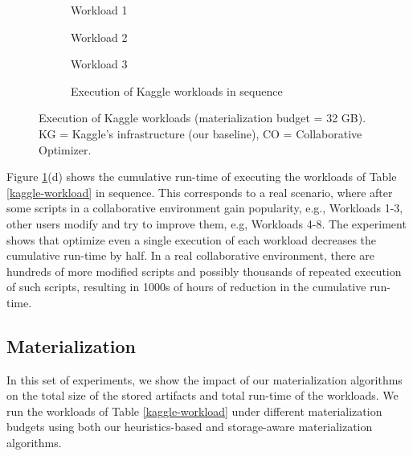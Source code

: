 \begin{figure}
\begin{subfigure}[b]{0.33\linewidth}
\centering
 \resizebox{\columnwidth}{!}{%
%
}
\caption{Workload 1}
\end{subfigure}%
\begin{subfigure}[b]{0.33\linewidth}
\centering
 \resizebox{\columnwidth}{!}{%
%
}
\caption{Workload 2}
\end{subfigure}%
\begin{subfigure}[b]{0.33\linewidth}
\centering
 \resizebox{\columnwidth}{!}{%
%
}
\caption{Workload 3}
\end{subfigure}
\begin{subfigure}[b]{\linewidth}
\centering
 \resizebox{\columnwidth}{!}{%
%
}
\caption{Execution of Kaggle workloads in sequence}
\end{subfigure}
\caption{Execution of Kaggle workloads (materialization budget = 32 GB). KG = Kaggle's infrastructure (our baseline), CO = Collaborative Optimizer.}
\label{exp-reuse-kaggle-same-workload}
\end{figure}

Figure \ref{exp-reuse-kaggle-same-workload}(d) shows the cumulative run-time of executing the workloads of Table \ref{kaggle-workload} in sequence.
This corresponds to a real scenario, where after some scripts in a collaborative environment gain popularity, e.g., Workloads 1-3, other users modify and try to improve them, e.g, Workloads 4-8.
The experiment shows that optimize even a single execution of each workload decreases the cumulative run-time by half.
In a real collaborative environment, there are hundreds of more modified scripts and possibly thousands of repeated execution of such scripts, resulting in 1000s of hours of reduction in the cumulative run-time.

\subsection{Materialization}
In this set of experiments, we show the impact of our materialization algorithms on the total size of the stored artifacts and total run-time of the workloads.
We run the workloads of Table \ref{kaggle-workload} under different materialization budgets using both our heuristics-based and storage-aware materialization algorithms.

